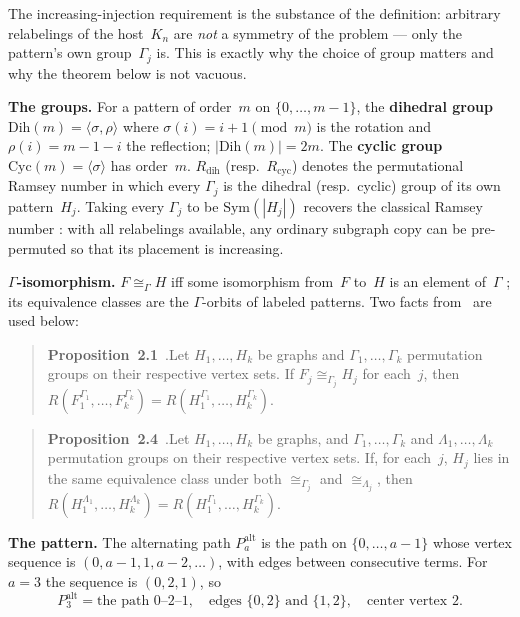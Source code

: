 \documentclass[11pt]{article}
\theoremstyle{definition}
\newcommand{\Dih}{\mathrm{Dih}}
\newcommand{\Sym}{\mathrm{Sym}}
\newcommand{\Cyc}{\mathrm{Cyc}}
\newcommand{\Rdih}{R_{\mathrm{dih}}}
\newcommand{\Rcyc}{R_{\mathrm{cyc}}}
\newcommand{\Palt}{P_3^{\mathrm{alt}}}
\begin{document}
The increasing-injection requirement is the substance of the definition: arbitrary
relabelings of the host~$K_n$ are \emph{not} a symmetry of the problem --- only
the pattern's own group~$\Gamma_j$ is. This is exactly why the choice of group
matters and why the theorem below is not vacuous.

\medskip\noindent\textbf{The groups.}\quad
For a pattern of order~$m$ on $\{0, \ldots, m-1\}$, the \textbf{dihedral group}
$\Dih(m) = \langle \sigma, \rho \rangle$ where $\sigma(i) = i+1 \pmod{m}$ is the
rotation and $\rho(i) = m-1-i$ the reflection; $|\Dih(m)| = 2m$. The
\textbf{cyclic group} $\Cyc(m) = \langle \sigma \rangle$ has order~$m$.
$\Rdih$ (resp.\ $\Rcyc$) denotes the permutational Ramsey number in which every
$\Gamma_j$ is the dihedral (resp.\ cyclic) group of its own pattern~$H_j$. Taking
every $\Gamma_j$ to be $\Sym(|H_j|)$ recovers the classical Ramsey number
\cite[\S1]{DD26}: with all relabelings available, any ordinary subgraph copy can
be pre-permuted so that its placement is increasing.

\medskip\noindent\textbf{$\Gamma$-isomorphism.}\quad
$F \cong_\Gamma H$ iff some isomorphism from~$F$ to~$H$ is an element
of~$\Gamma$ \cite[\S2]{DD26}; its equivalence classes are the $\Gamma$-orbits of
labeled patterns. Two facts from~\cite{DD26} are used below:

\begin{quote}
\textbf{Proposition~2.1}~\cite{DD26}.\quad Let $H_1, \ldots, H_k$ be graphs and
$\Gamma_1, \ldots, \Gamma_k$ permutation groups on their respective vertex sets.
If $F_j \cong_{\Gamma_j} H_j$ for each~$j$, then
$R(F_1^{\Gamma_1}, \ldots, F_k^{\Gamma_k}) =
R(H_1^{\Gamma_1}, \ldots, H_k^{\Gamma_k})$.
\end{quote}

\begin{quote}
\textbf{Proposition~2.4}~\cite{DD26}.\quad Let $H_1, \ldots, H_k$ be graphs, and
$\Gamma_1, \ldots, \Gamma_k$ and $\Lambda_1, \ldots, \Lambda_k$ permutation
groups on their respective vertex sets. If, for each~$j$, $H_j$ lies in the same
equivalence class under both $\cong_{\Gamma_j}$ and $\cong_{\Lambda_j}$, then
$R(H_1^{\Lambda_1}, \ldots, H_k^{\Lambda_k}) =
R(H_1^{\Gamma_1}, \ldots, H_k^{\Gamma_k})$.
\end{quote}

\medskip\noindent\textbf{The pattern.}\quad
The alternating path $P_a^{\mathrm{alt}}$ is the path on $\{0, \ldots, a-1\}$
whose vertex sequence is $(0, a{-}1, 1, a{-}2, \ldots)$, with edges between
consecutive terms. For $a=3$ the sequence is $(0,2,1)$, so
\[
  \Palt = \text{the path } 0\text{--}2\text{--}1, \quad
  \text{edges } \{0,2\} \text{ and } \{1,2\}, \quad
  \text{center vertex } 2.
\]
\end{document}
